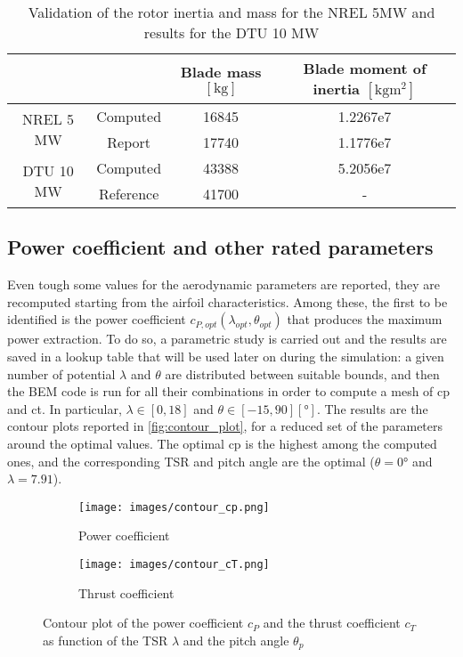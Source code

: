 \begin{table}[htb]
 \caption{Validation of the rotor inertia and mass for the NREL 5MW and results for the DTU 10 MW}
\centering
	\begin{tabular}{cccc}
		\toprule
		              &             & Blade mass $\left[\si{\kilo\gram}\right]$ & Blade moment of inertia $\left[\si{\kilo\gram\square\meter}\right]$\\ \midrule
                \multirow{2}{*}{NREL 5 MW}		     &  Computed 	& 16845	&  1.2267e7\\
		              & Report	\cite{NREL_5MW_reference} & 17740 &  1.1776e7\\ \midrule
            \multirow{2}{*}{DTU 10 MW}& Computed    &  43388 & 5.2056e7\\
            & Reference \cite{review_of_scaling_low} & 41700 & -\\ 
		\bottomrule
	\end{tabular}
 \label{tab:rotor_inertia}
\end{table}

\subsection{Power coefficient and other rated parameters}\label{subsec:lookup_cp}
Even tough some values for the aerodynamic parameters are reported, they are recomputed starting from the airfoil characteristics. Among these, the first to be identified is the power coefficient $c_{P, opt}(\lambda_{opt}, \theta_{opt})$ that produces the maximum power extraction. To do so, a parametric study is carried out and the results are saved in a lookup table that will be used later on during the simulation: a given number of potential $\lambda$ and $\theta$ are distributed between suitable bounds, and then the \acrshort{BEM} code is run for all their combinations in order to compute a mesh of \acrshort{cp} and \acrshort{ct}. In particular, $\lambda \in \left[0, 18\right]$  and $\theta \in \left[-15, 90\right] \left[\si{\degree}\right]$. The results are the contour plots reported in \autoref{fig:contour_plot}, for a reduced set of the parameters around the optimal values. The optimal \acrlong{cp} is the highest among the computed ones, and the corresponding \acrshort{TSR} and pitch angle are the optimal ($\theta=0\si{\degree}$ and $\lambda=7.91$). 

\begin{figure}[htb]
    \centering
    \begin{subfigure}{0.49\textwidth}
    \centering
    \texttt{[image: images/contour\_cp.png]}
    \caption{Power coefficient}
    \label{fig:contour_cp}
    \end{subfigure}
    \begin{subfigure}{0.49\textwidth}
    \centering
    \texttt{[image: images/contour\_cT.png]}
    \caption{Thrust coefficient}
    \label{fig:contour_cT}
    \end{subfigure}
    \caption{Contour plot of the power coefficient $c_P$ and  the thrust coefficient $c_T$ as function of the \acrlong{TSR} $\lambda$ and the pitch angle $\theta_p$}
    \label{fig:contour_plot}
\end{figure}

